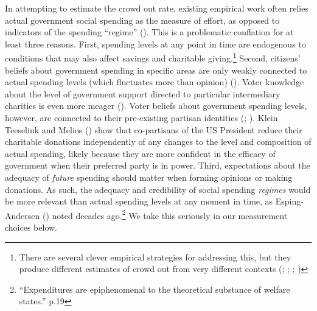 \documentclass[
  11pt,
  oneside]{article}
\begin{document}
In attempting to estimate the crowd out rate, existing empirical work often relies actual government social spending as the measure of effort, as opposed to indicators of the spending ``regime'' (). This is a problematic conflation for at least three reasons. First, spending levels at any point in time are endogenous to conditions that may also affect savings and charitable giving.\footnote{There are several clever empirical strategies for addressing this, but they produce different estimates of crowd out from very different contexts (; ; ; )} Second, citizens' beliefs about government spending in specific areas are only weakly connected to actual spending levels (which fluctuates more than opinion) (). Voter knowledge about the level of government support directed to particular intermediary charities is even more meager (). Voter beliefs about government spending levels, however, are connected to their pre-existing partisan identities (; ). Klein Teeselink and Melios () show that co-partisans of the US President reduce their charitable donations independently of any changes to the level and composition of actual spending, likely because they are more confident in the efficacy of government when their preferred party is in power. Third, expectations about the adequacy of \emph{future} spending should matter when forming opinions or making donations. As such, the adequacy and credibility of social spending \emph{regimes} would be more relevant than actual spending levels at any moment in time, as Esping-Andersen () noted decades ago.\footnote{``Expenditures are epiphenomenal to the theoretical substance of welfare states.'' p.19} We take this seriously in our measurement choices below.
\end{document}

